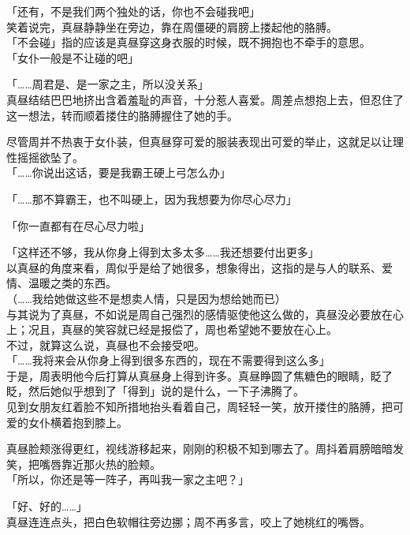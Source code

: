 「还有，不是我们两个独处的话，你也不会碰我吧」\\

笑着说完，真昼静静坐在旁边，靠在周僵硬的肩膀上搂起他的胳膊。\\

「不会碰」指的应该是真昼穿这身衣服的时候，既不拥抱也不牵手的意思。\\

「女仆一般是不让碰的吧」

「……周君是、是一家之主，所以没关系」\\

真昼结结巴巴地挤出含着羞耻的声音，十分惹人喜爱。周差点想抱上去，但忍住了这一想法，转而顺着搂住的胳膊握住了她的手。

尽管周并不热衷于女仆装，但真昼穿可爱的服装表现出可爱的举止，这就足以让理性摇摇欲坠了。\\

「……你说出这话，要是我霸王硬上弓怎么办」

「……那不算霸王，也不叫硬上，因为我想要为你尽心尽力」

「你一直都有在尽心尽力啦」

「这样还不够，我从你身上得到太多太多……我还想要付出更多」\\

以真昼的角度来看，周似乎是给了她很多，想象得出，这指的是与人的联系、爱情、温暖之类的东西。\\

（……我给她做这些不是想卖人情，只是因为想给她而已）\\

与其说为了真昼，不如说是周自己强烈的感情驱使他这么做的，真昼没必要放在心上；况且，真昼的笑容就已经是报偿了，周也希望她不要放在心上。\\

不过，就算这么说，真昼也不会接受吧。\\

「……我将来会从你身上得到很多东西的，现在不需要得到这么多」\\

于是，周表明他今后打算从真昼身上得到许多。真昼睁圆了焦糖色的眼睛，眨了眨，然后她似乎想到了「得到」说的是什么，一下子沸腾了。\\

见到女朋友红着脸不知所措地抬头看着自己，周轻轻一笑，放开搂住的胳膊，把可爱的女仆横着抱到膝上。

真昼脸颊涨得更红，视线游移起来，刚刚的积极不知到哪去了。周抖着肩膀暗暗发笑，把嘴唇靠近那火热的脸颊。\\

「所以，你还是等一阵子，再叫我一家之主吧？」

「好、好的……」\\

真昼连连点头，把白色软帽往旁边挪；周不再多言，咬上了她桃红的嘴唇。
